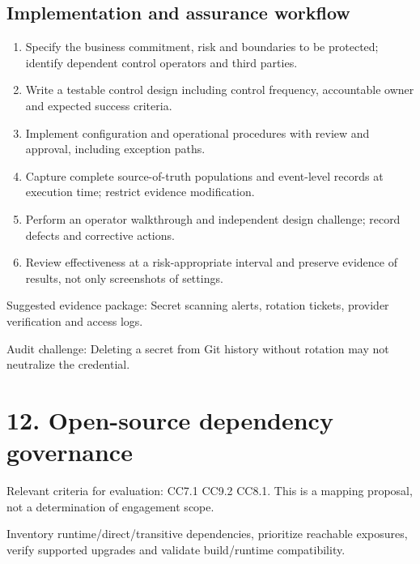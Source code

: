 \documentclass[10pt,oneside]{report}
\begin{document}
\subsection{Implementation and assurance workflow}
\begin{enumerate}
\item Specify the business commitment, risk and boundaries to be protected; identify dependent control operators and third parties.
\item Write a testable control design including control frequency, accountable owner and expected success criteria.
\item Implement configuration and operational procedures with review and approval, including exception paths.
\item Capture complete source-of-truth populations and event-level records at execution time; restrict evidence modification.
\item Perform an operator walkthrough and independent design challenge; record defects and corrective actions.
\item Review effectiveness at a risk-appropriate interval and preserve evidence of results, not only screenshots of settings.
\end{enumerate}

Suggested evidence package: Secret scanning alerts, rotation tickets, provider verification and access logs.

Audit challenge: Deleting a secret from Git history without rotation may not neutralize the credential.

\section{12. Open-source dependency governance}
Relevant criteria for evaluation: CC7.1 CC9.2 CC8.1. This is a mapping proposal, not a determination of engagement scope.

\begin{engineeringbox}
Inventory runtime/direct/transitive dependencies, prioritize reachable exposures, verify supported upgrades and validate build/runtime compatibility.
\end{engineeringbox}
\end{document}
